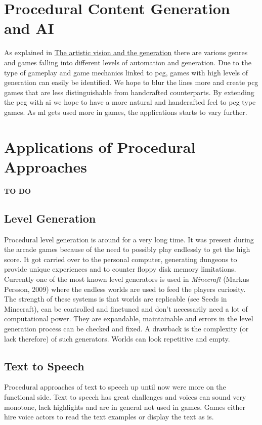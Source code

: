 \documentclass[10pt,a4paper]{article}
\begin{document}
\section{Procedural Content Generation and AI}
As explained in \hyperref[sec:visionVSgeneration]{The artistic vision and the generation} there are various genres and games falling into different levels of automation and generation. Due to the type of gameplay and game mechanics linked to \gls{pcg}, games with high levels of generation can easily be identified. We hope to blur the lines more and create \gls{pcg} games that are less distinguishable from handcrafted counterparts. By extending the \gls{pcg} with \gls{ai} we hope to have a more natural and handcrafted feel to \gls{pcg} type games. As \gls{ml} gets used more in games, the applications starts to vary further.

\section{Applications of Procedural Approaches}
\textbf{TO DO}

\subsection{Level Generation}
Procedural level generation is around for a very long time. It was present during the arcade games because of the need to possibly play endlessly to get the high score. It got carried over to the personal computer, generating dungeons to provide unique experiences and to counter floppy disk memory limitations. Currently one of the most known level generators is used in \textit{Minecraft} (Markus Persson, 2009) where the endless worlds are used to feed the players curiosity. The strength of these systems is that worlds are replicable (see Seeds in Minecraft), can be controlled and finetuned and don't necessarily need a lot of computational power. They are expandable, maintainable and errors in the level generation process can be checked and fixed. A drawback is the complexity (or lack therefore) of such generators. Worlds can look repetitive and empty.

\subsection{Text to Speech}
Procedural approaches of text to speech up until now were more on the functional side. Text to speech has great challenges and voices can sound very monotone, lack highlights and are in general not used in games. Games either hire voice actors to read the text examples or display the text as is.
\end{document}
